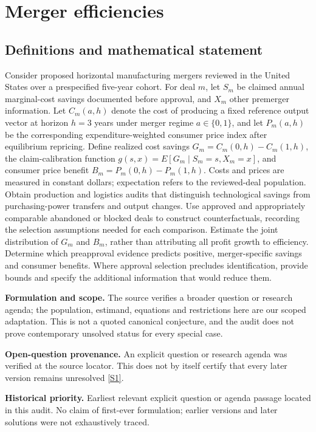 \documentclass[11pt]{article}
\newcommand{\sref}[2]{\hyperlink{source:#1:#2}{[S#2]}}
\begin{document}
\section*{Merger efficiencies}\label{30007676}
\subsection{Definitions and mathematical statement}
Consider proposed horizontal manufacturing mergers reviewed in the United States over a prespecified five-year cohort. For deal \(m\), let \(S_m\) be claimed annual marginal-cost savings documented before approval, and \(X_m\) other premerger information. Let \(C_m(a,h)\) denote the cost of producing a fixed reference output vector at horizon \(h=3\) years under merger regime \(a\in\{0,1\}\), and let \(P_m(a,h)\) be the corresponding expenditure-weighted consumer price index after equilibrium repricing. Define realized cost savings \(G_m=C_m(0,h)-C_m(1,h)\), the claim-calibration function \(g(s,x)=E[G_m\mid S_m=s,X_m=x]\), and consumer price benefit \(B_m=P_m(0,h)-P_m(1,h)\). Costs and prices are measured in constant dollars; expectation refers to the reviewed-deal population. Obtain production and logistics audits that distinguish technological savings from purchasing-power transfers and output changes. Use approved and appropriately comparable abandoned or blocked deals to construct counterfactuals, recording the selection assumptions needed for each comparison. Estimate the joint distribution of \(G_m\) and \(B_m\), rather than attributing all profit growth to efficiency. Determine which preapproval evidence predicts positive, merger-specific savings and consumer benefits. Where approval selection precludes identification, provide bounds and specify the additional information that would reduce them.

\par\textbf{Formulation and scope.} The source verifies a broader question or research agenda; the population, estimand, equations and restrictions here are our scoped adaptation. This is not a quoted canonical conjecture, and the audit does not prove contemporary unsolved status for every special case.

\par\textbf{Open-question provenance.} An explicit question or research agenda was verified at the source locator. This does not by itself certify that every later version remains unresolved \sref{30007676}{1}.

\par\textbf{Historical priority.} Earliest relevant explicit question or agenda passage located in this audit. No claim of first-ever formulation; earlier versions and later solutions were not exhaustively traced.
\end{document}
